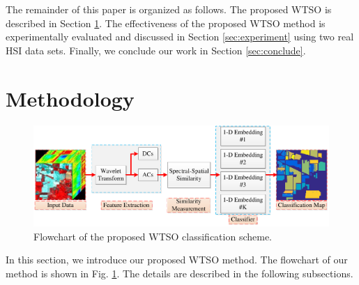 \documentclass{ws-ijwmip}
\begin{document}
%


The remainder of this paper is organized as follows. The proposed WTSO is described in Section \ref{sec:proposed}. The effectiveness of the proposed WTSO method is experimentally evaluated and discussed in Section \ref{sec:experiment} using two real HSI data sets. Finally, we conclude our work in Section \ref{sec:conclude}.



\section{Methodology}\label{sec:proposed}
\begin{figure}[bh]
	\centerline{\includegraphics[width=13cm]{image/flow-chart}}
	\vspace*{8pt}
	\caption{Flowchart of the proposed WTSO classification scheme.}
	\label{figure1}
\end{figure}
In this section, we introduce our proposed  WTSO method. The flowchart of our method is shown in Fig. \ref{figure1}.
The details are described in the following subsections.
\end{document}
